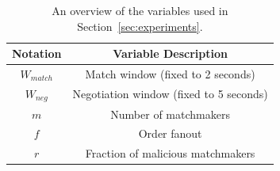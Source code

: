 



%

\begin{table}[t!]
	\centering
	\begin{tabular}{|c|c|}
		\hline
		\textbf{Notation} & \textbf{Variable Description} \\ \hline
		$ W_{match} $ & Match window (fixed to 2 seconds) \\ \hline
		$ W_{neg} $ & Negotiation window (fixed to 5 seconds) \\ \hline
		$ m $ & Number of matchmakers \\ \hline
		$ f $ & Order fanout \\ \hline
		$ r $ & Fraction of malicious matchmakers \\ \hline
	\end{tabular}
	\caption{An overview of the variables used in Section~\ref{sec:experiments}.}
	\label{table:experiment_parameters}
\end{table}

